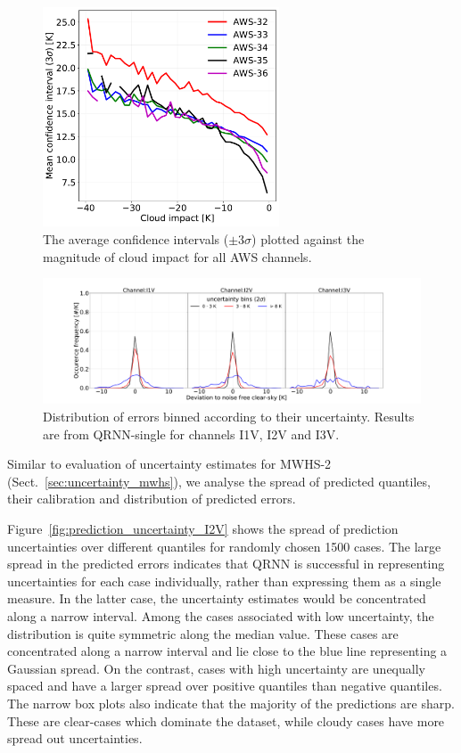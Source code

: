 \documentclass[amt, manuscript]{copernicus}
\begin{document}
\begin{figure}[t]
	\includegraphics[width = 70mm]{Figures/cloud_impact_uncertainty_AWS.pdf}	
	\caption{The average confidence intervals ($\pm3\sigma$) plotted against the magnitude of cloud impact for all AWS channels.}
	\label{fig:uncertainty_cloud_impact}	
\end{figure}
\begin{figure}[t]
	\includegraphics[width=\textwidth]{Figures/PDF_uncertainty_bins_QRNN-single.pdf}	
	\caption{Distribution of errors binned according to their uncertainty. Results are from QRNN-single for channels I1V, I2V and I3V.}
	\label{fig:error_distribution_uncertainty_bins}	
\end{figure}

Similar to evaluation of uncertainty estimates for MWHS-2 (Sect.~\ref{sec:uncertainty_mwhs}), we analyse the spread of predicted quantiles, their calibration and distribution of predicted errors. 

Figure~\ref{fig:prediction_uncertainty_I2V} shows the spread of prediction uncertainties over different quantiles for randomly chosen 1500 cases. The large spread in the predicted errors indicates that QRNN is successful in representing uncertainties for each case individually, rather than expressing them as a single measure. In the latter case, the uncertainty estimates would be concentrated along a narrow interval. Among the cases associated with low uncertainty, the distribution is quite symmetric along the median value. These cases are concentrated along a narrow interval and lie close to the blue line representing a Gaussian spread. On the contrast, cases with high uncertainty are unequally spaced and have a larger spread over positive quantiles than negative quantiles. The narrow box plots also indicate that the majority of the predictions are sharp. These are clear-cases which dominate the dataset, while cloudy cases have more spread out uncertainties. 
\end{document}
